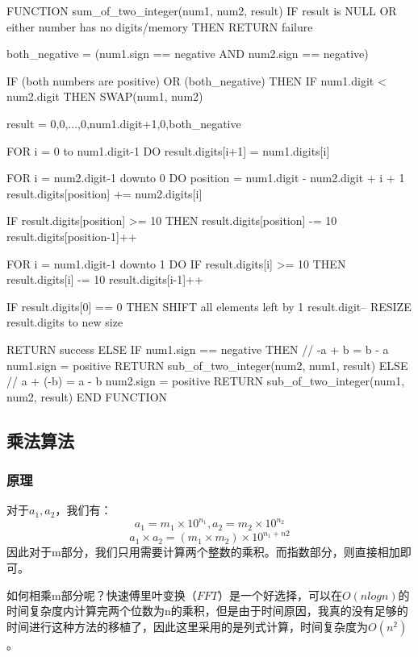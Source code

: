 \documentclass[11pt]{article}
\begin{document}
\begin{codeline}
FUNCTION sum_of_two_integer(num1, num2, result)
    IF result is NULL OR either number has no digits/memory THEN
        RETURN failure
    
    both_negative = (num1.sign == negative AND num2.sign == negative)
    
    IF (both numbers are positive) OR (both_negative) THEN
        IF num1.digit < num2.digit THEN
            SWAP(num1, num2)
        
        result = {{0,0,...,0},num1.digit+1,0,both_negative}
        
        FOR i = 0 to num1.digit-1 DO
            result.digits[i+1] = num1.digits[i]
        
        FOR i = num2.digit-1 downto 0 DO
            position = num1.digit - num2.digit + i + 1
            result.digits[position] += num2.digits[i]
            
            IF result.digits[position] >= 10 THEN
                result.digits[position] -= 10
                result.digits[position-1]++

        FOR i = num1.digit-1 downto 1 DO
            IF result.digits[i] >= 10 THEN
                result.digits[i] -= 10
                result.digits[i-1]++
  
        IF result.digits[0] == 0 THEN
            SHIFT all elements left by 1
            result.digit--
            RESIZE result.digits to new size
        
        RETURN success
    ELSE
        IF num1.sign == negative THEN
            // -a + b = b - a
            num1.sign = positive
            RETURN sub_of_two_integer(num2, num1, result)
        ELSE
            // a + (-b) = a - b
            num2.sign = positive
            RETURN sub_of_two_integer(num1, num2, result)
END FUNCTION
\end{codeline}
\subsection{乘法算法}
\subsubsection{原理}
对于$a_1,a_2$，我们有：
\[
a_1 = m_1 \times 10^{n_1} , a_2 = m_2 \times 10^{n_2}
\]
\[
a_1 \times a_2 = (m_1  \times m_2) \times 10^{n_1+n2}
\]因此对于m部分，我们只用需要计算两个整数的乘积。而指数部分，则直接相加即可。


如何相乘m部分呢？快速傅里叶变换（$FFT$）是一个好选择，可以在$O(nlogn)$的时间复杂度内计算完两个位数为n的乘积，但是由于时间原因，我真的没有足够的时间进行这种方法的移植了，因此这里采用的是列式计算，时间复杂度为$O(n^2)$。
\end{document}
